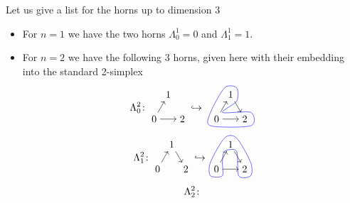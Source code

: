 \begin{exmp}
    Let us give a list for the horns up to dimension 3
    \begin{itemize}
        \item 
        For $ n = 1 $ we have the two horns $\Lambda_0^1 =0 $ and $\Lambda_1^1=1$.
        \item 
        For $ n = 2 $ we have the following 3 horns, given here with their embedding into the standard 2-simplex
        \[
        \Lambda_0^2 \colon 
        \begin{tikzpicture}[baseline={(0,0.3)}]
            \node (A) at (0,0.866) {$1$};
            \node (B) at (-0.5,0) {$0$};
            \node (C) at (0.5,0) {$2$};
            \draw [->] (B) -- (A);
            \draw [->] (B) -- (C);
        \end{tikzpicture}
        \hookrightarrow
        \begin{tikzpicture}[baseline={(0,0.3)}]
            \node (A) at (0,0.866) {$1$};
            \node (B) at (-0.5,0) {$0$};
            \node (C) at (0.5,0) {$2$};
            \draw [->] (A) -- (C);
            \draw [->] (B) -- (A);
            \draw [->] (B) -- (C);
            \draw [blue] plot [smooth cycle] coordinates {(A.north west)     (A.north east) (A.south east) (B.north east) (C.north east) (C.south east) (B.south west) (B.north west) };
        \end{tikzpicture}
        \]
        \[
        \Lambda_1^2 \colon 
        \begin{tikzpicture}[baseline={(0,0.3)}]
            \node (A) at (0,0.866) {$1$};
            \node (B) at (-0.5,0) {$0$};
            \node (C) at (0.5,0) {$2$};
            \draw [->] (B) -- (A);
            \draw [->] (A) -- (C);
        \end{tikzpicture}
        \hookrightarrow
        \begin{tikzpicture}[baseline={(0,0.3)}]
            \node (A) at (0,0.866) {$1$};
            \node (B) at (-0.5,0) {$0$};
            \node (C) at (0.5,0) {$2$};
            \draw [->] (A) -- (C);
            \draw [->] (B) -- (A);
            \draw [->] (B) -- (C);
            \draw [blue] plot [smooth cycle] coordinates {(A.north west) 
            (A.north east) (C.north east) (C.south east) (C.south west) (A.south east) (A.south west) (B.north east) (B.south east) (B.south west) (B.north west) };
        \end{tikzpicture}
        \]
        \[
        \Lambda_2^2 \colon 
        \begin{tikzpicture}[baseline={(0,0.3)}]

\end{tikzpicture}\]
\end{itemize}
\end{exmp}

